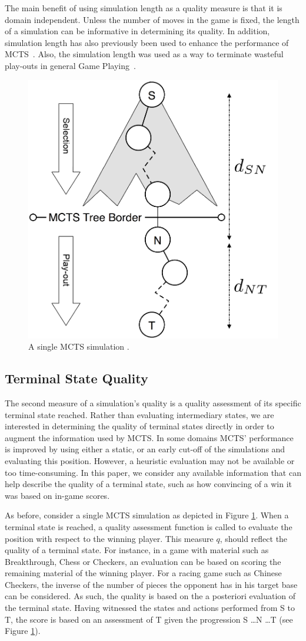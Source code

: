 \documentclass{ecai2014}
\newcommand{\node}[1]{{\fontfamily{phv}\selectfont#1}}
\begin{document}
The main benefit of using simulation length as a quality measure is that it is domain independent. Unless the number of moves in the game is fixed, the length of a simulation can be informative in determining its quality. In addition, simulation length has also previously been used to enhance the performance of MCTS~\cite{Enzenberger10Fuego,keller13thts,roschke2013cc}. Also, the simulation length was used as a way to terminate wasteful play-outs in general Game Playing~\cite{finnsson2012generalized}.
\begin{figure}[t]
	\centering
	\includegraphics[width=.25\textwidth]{img/figure2_new.png}
	\caption{A single MCTS simulation \cite{finnsson2012generalized}.}
	\label{fig:mcts-simulation}
\end{figure}
\subsection{Terminal State Quality}
\label{sub:termqual}

The second measure of a simulation's quality is a quality assessment of its specific terminal state reached. Rather than evaluating intermediary states, we are interested in determining the quality of terminal states directly in order to augment the information used by MCTS. In some domains MCTS' performance is improved by using either a static, or an early cut-off of the simulations and evaluating this position. However, a heuristic evaluation may not be available or too time-consuming. In this paper, we consider any available information that can help describe the quality of a terminal state, such as how convincing of a win it was based on in-game scores.  

As before, consider a single MCTS simulation as depicted in Figure \ref{fig:mcts-simulation}. When a terminal state is reached, a quality assessment function is called to evaluate the position with respect to the winning player. This measure $q$, should reflect the quality of a terminal state. For instance, in a game with material such as Breakthrough, Chess or Checkers, an evaluation can be based on scoring the remaining material of the winning player. For a racing game such as Chinese Checkers, the inverse of the number of pieces the opponent has in his target base can be considered. As such, the quality is based on the a posteriori evaluation of the terminal state. Having witnessed the states and actions performed from \node{S} to \node{T}, the score is based on an assessment of \node{T} given the progression \node{S} \ldots \node{N} \ldots \node{T} (see Figure \ref{fig:mcts-simulation}).
\end{document}
